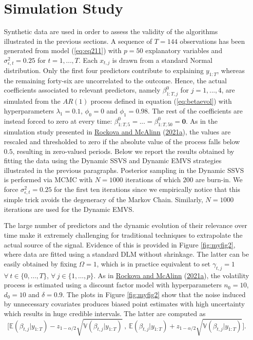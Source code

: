 \documentclass[
  12pt,
]{book}
\theoremstyle{break}
\theoremstyle{nonumberplain}
\begin{document}
\section{Simulation Study}\label{SD}

Synthetic data are used in order to assess the validity of the
algorithms illustrated in the previous sections. A sequence of \(T=144\)
observations has been generated from model (\ref{eq:eq211}) with
\(p=50\) explanatory variables and \(\sigma^{2}_{\epsilon,t}=0.25\) for
\(t=1,...,T\). Each \(x_{t,j}\) is drawn from a standard Normal
distribution. Only the first four predictors contribute to explaining
\(y_{1:T}\), whereas the remaining forty-six are uncorrelated to the
outcome. Hence, the actual coefficients associated to relevant
predictors, namely \(\beta_{1:T,j}^{0}\) for \(j=1,...,4\), are
simulated from the \(AR(1)\) process defined in equation
(\ref{eq:betaevol}) with hyperparameters \(\lambda_{1}=0.1\),
\(\phi_{0}=0\) and \(\phi_{1}=0.98\). The rest of the coefficients are
instead forced to zero at every time:
\(\beta_{1:T,5}^{0}=...=\beta_{1:T,50}^{0}=\boldsymbol{0}\). As in the
simulation study presented in
\protect\hyperlink{ref-rockova_mcalinn_2021}{Rockova and McAlinn}
(\protect\hyperlink{ref-rockova_mcalinn_2021}{2021a}), the values are
rescaled and thresholded to zero if the absolute value of the process
falls below \(0.5\), resulting in zero-valued periods. Below we report
the results obtained by fitting the data using the Dynamic SSVS and
Dynamic EMVS strategies illustrated in the previous paragraphs.
Posterior sampling in the Dynamic SSVS is performed via MCMC with
\(N=1000\) iterations of which \(200\) are burn-in. We force
\(\sigma_{\epsilon,t}^{2}= 0.25\) for the first ten iterations since we
empirically notice that this simple trick avoids the degeneracy of the
Markov Chain. Similarly, \(N=1000\) iterations are used for the Dynamic
EMVS.

The large number of predictors and the dynamic evolution of their
relevance over time make it extremely challenging for traditional
techniques to extrapolate the actual source of the signal. Evidence of
this is provided in Figure \ref{fig:myfig2}, where data are fitted using
a standard DLM without shrinkage. The latter can be easily obtained by
fixing \(\Omega=1\), which is in practice equivalent to set
\(\gamma_{t,j}=1\) \(\forall \ t \in \{0,\ldots,T\}\),
\(\forall \ j \in \{1,\ldots,p\}\). As in
\protect\hyperlink{ref-rockova_mcalinn_2021}{Rockova and McAlinn}
(\protect\hyperlink{ref-rockova_mcalinn_2021}{2021a}), the volatility
process is estimated using a discount factor model with hyperparameters
\(n_{0}=10\), \(d_{0}=10\) and \(\delta=0.9\). The plots in Figure
\ref{fig:myfig2} show that the noise induced by unnecessary covariates
produces biased point estimates with high uncertainty which results in
huge credible intervals. The latter are computed as
\[ \bigg[\mathbb E(\beta_{t,j}|y_{1:T})-z_{1-\alpha/2}\sqrt{\mathbb V(\beta_{t,j}|y_{1:T})} \ ,\ \mathbb E(\beta_{t,j}|y_{1:T})+z_{1-\alpha/2}\sqrt{\mathbb V(\beta_{t,j}|y_{1:T})}\bigg].
\]
\end{document}
